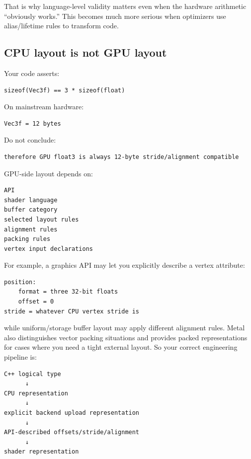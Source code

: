 That is why language-level validity matters even when the hardware arithmetic ``obviously works.'' This becomes much more serious when optimizers use alias/lifetime rules to transform code.

\subsection{CPU layout is not GPU layout}\label{01-foundations-i-ch003-cpu-layout-is-not-gpu-layout}

\hypertarget{01-foundations-i-ch003-cpu-layout-is-not-gpu-layout}{}

Your code asserts:

\begin{verbatim}
sizeof(Vec3f) == 3 * sizeof(float)
\end{verbatim}

On mainstream hardware:

\begin{verbatim}
Vec3f = 12 bytes
\end{verbatim}

Do not conclude:

\begin{verbatim}
therefore GPU float3 is always 12-byte stride/alignment compatible
\end{verbatim}

GPU-side layout depends on:

\begin{verbatim}
API
shader language
buffer category
selected layout rules
alignment rules
packing rules
vertex input declarations
\end{verbatim}

For example, a graphics API may let you explicitly describe a vertex attribute:

\begin{verbatim}
position:
    format = three 32-bit floats
    offset = 0
stride = whatever CPU vertex stride is
\end{verbatim}

while uniform/storage buffer layout may apply different alignment rules. Metal also distinguishes vector packing situations and provides packed representations for cases where you need a tight external layout. So your correct engineering pipeline is:

\begin{verbatim}
C++ logical type
      ↓
CPU representation
      ↓
explicit backend upload representation
      ↓
API-described offsets/stride/alignment
      ↓
shader representation
\end{verbatim}

